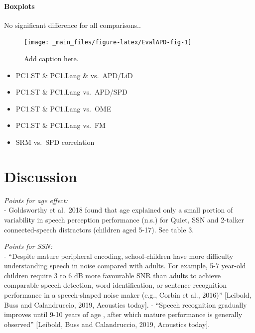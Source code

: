 \documentclass[a4paper, twoside]{templates/ociamthesis}
\begin{document}
\hypertarget{boxplots}{%
\paragraph{Boxplots}\label{boxplots}}

No significant difference for all comparisons..

\begin{figure}

{\centering \texttt{[image: \_main\_files/figure-latex/EvalAPD-fig-1]} 

}

\caption{Add caption here.}\label{fig:EvalAPD-fig}
\end{figure}

\begin{itemize}
\item
  PC1.ST \& PC1.Lang \& vs.~APD/LiD
\item
  PC1.ST \& PC1.Lang vs.~APD/SPD
\item
  PC1.ST \& PC1.Lang vs.~OME
\item
  PC1.ST \& PC1.Lang vs.~FM
\item
  SRM vs.~SPD correlation
\end{itemize}

\hypertarget{discussion-4}{%
\section{Discussion}\label{discussion-4}}

\emph{Points for age effect:}\\
- Goldsworthy et al.~2018 found that age explained only a small portion of variability in speech perception performance (n.s.) for Quiet, SSN and 2-talker connected-speech distractors (children aged 5-17). See table 3.

\emph{Points for SSN:}\\
- ``Despite mature peripheral encoding, school-children have more difficulty understanding speech in noise compared with adults. For example, 5-7 year-old children require 3 to 6 dB more favourable SNR than adults to achieve comparable speech detection, word identification, or sentence recognition performance in a speech-shaped noise maker (e.g., Corbin et al., 2016)'' {[}Leibold, Buss and Calandruccio, 2019, Acoustics today{]}. - ``Speech recognition gradually improves until 9-10 years of age , after which mature performance is generally observed'' {[}Leibold, Buss and Calandruccio, 2019, Acoustics today{]}.
\end{document}
